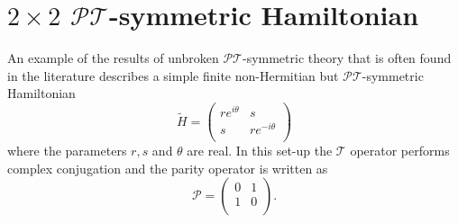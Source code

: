 \documentclass[12pt, a4paper]{report}
\newcommand\PT{\(\mathcal{PT}\)}
\newcommand\TT{\(\mathcal{T}\)}
\begin{document}
\section{$2\times2$ \PT-symmetric Hamiltonian}
An example of the results of unbroken \PT-symmetric theory that is often found in the literature describes a simple finite non-Hermitian but \PT-symmetric Hamiltonian
\begin{equation}\label{eq:2.12}
\tilde{H} = \begin{pmatrix}
re^{i\theta} & s  \\
s & re^{-i\theta} \\
\end{pmatrix}
\end{equation}
where the parameters $r, s$ and $\theta$ are real. In this set-up the \TT\: operator performs complex conjugation and the parity operator is written as
\begin{equation}\label{eq:2.13}
\mathcal{P} = \begin{pmatrix}
0 & 1  \\
1 & 0 \\
\end{pmatrix}.
\end{equation}
\end{document}
